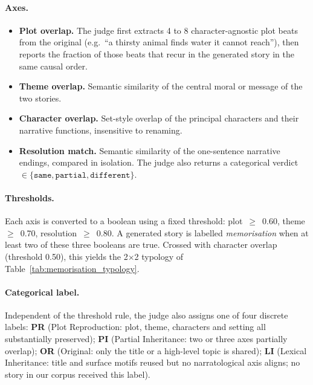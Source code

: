\documentclass[11pt]{article}
\begin{document}
\paragraph{Axes.}
\begin{itemize}
  \item \textbf{Plot overlap.} The judge first extracts
        4 to 8 character-agnostic plot beats from the
        original (e.g.\ ``a thirsty animal finds water it
        cannot reach''), then reports the fraction of
        those beats that recur in the generated story in
        the same causal order.
  \item \textbf{Theme overlap.} Semantic similarity of the
        central moral or message of the two stories.
  \item \textbf{Character overlap.} Set-style overlap of
        the principal characters and their narrative
        functions, insensitive to renaming.
  \item \textbf{Resolution match.} Semantic similarity of
        the one-sentence narrative endings, compared in
        isolation. The judge also returns a categorical
        verdict
        $\in\{\texttt{same},\texttt{partial},\texttt{different}\}$.
\end{itemize}

\paragraph{Thresholds.}
Each axis is converted to a boolean using a fixed
threshold: plot~$\geq$~0.60, theme~$\geq$~0.70,
resolution~$\geq$~0.80. A generated story is labelled
\emph{memorisation} when at least two of these three
booleans are true. Crossed with character overlap
(threshold 0.50), this yields the 2$\times$2 typology of
Table~\ref{tab:memorisation_typology}.

\paragraph{Categorical label.}
Independent of the threshold rule, the judge also assigns
one of four discrete labels:
\textbf{PR} (Plot Reproduction: plot, theme, characters
and setting all substantially preserved);
\textbf{PI} (Partial Inheritance: two or three axes
partially overlap);
\textbf{OR} (Original: only the title or a high-level
topic is shared);
\textbf{LI} (Lexical Inheritance: title and surface motifs
reused but no narratological axis aligns; no story in our
corpus received this label).
\end{document}
